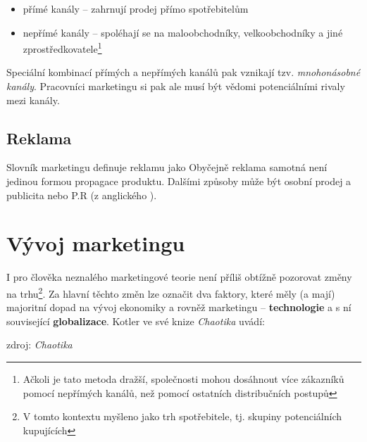 \begin{itemize}
    \item přímé kanály -- zahrnují prodej přímo spotřebitelům
    \item nepřímé kanály -- spoléhají se na maloobchodníky, velkoobchodníky a jiné zprostředkovatele\footnote{Ačkoli je tato metoda dražší, společnosti mohou dosáhnout více zákazníků pomocí nepřímých kanálů, než pomocí ostatních distribučních postupů\cite["marketingový mix", s. 114]{clemente2004slovnikmarketingu}}
\end{itemize}

Speciální kombinací přímých a nepřímých kanálů pak vznikají tzv. \textit{mnohonásobné kanály}. Pracovníci marketingu si pak ale musí být vědomi potenciálními rivaly mezi kanály.


\subsection{Reklama}
Slovník marketingu definuje reklamu jako \cite["reklama", s. 115]{clemente2004slovnikmarketingu} Obyčejně reklama samotná není jedinou formou propagace produktu. Dalšími způsoby může být osobní prodej a publicita nebo P.R (z anglického ).


\section{Vývoj marketingu}

I pro člověka neznalého marketingové teorie není příliš obtížně pozorovat změny na trhu\footnote{V tomto kontextu myšleno jako trh spotřebitele, tj. skupiny potenciálních kupujících}.
Za hlavní  těchto změn lze označit dva faktory, které měly (a mají) majoritní dopad na vývoj ekonomiky a rovněž marketingu -- \textbf{technologie} a s ní související \textbf{globalizace}. Kotler ve své knize \textit{Chaotika}\cite[s. 14]{kotler2009chaotika} uvádí:

\begin{aquote}{zdroj: \textit{Chaotika}}
\end{aquote}

